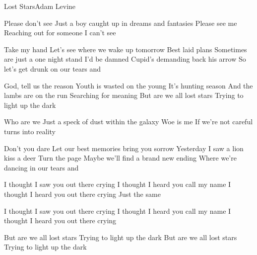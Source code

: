 \documentclass[a4paper,11pt,french]{article}
\begin{document}

\begin{Song}{Lost Stars}{Adam Levine}
\begin{multicols}{2}

\begin{Verse}
Please don't see
Just a boy caught up in dreams and fantasies
Please see me
Reaching out for someone I can't see
\espaceInterStrophe

Take my hand 
Let's see where we wake up tomorrow
Best laid plans 
Sometimes are just a one night stand
I'd be damned 
Cupid's demanding back his arrow
So let's get drunk on our tears and
\end{Verse}
\espaceInterStrophe

\begin{Chorus}
God, tell us the reason 
Youth is wasted on the young
It's hunting season 
And the lambs are on the run
Searching for meaning
But are we all lost stars
Trying to light up the dark
\end{Chorus}
\vfill
\columnbreak

\begin{Verse}
Who are we
Just a speck of dust within the galaxy
Woe is me
If we're not careful turns into reality
\espaceInterStrophe

Don't you dare
Let our best memories bring you sorrow
Yesterday
I saw a lion kiss a deer
Turn the page
Maybe we'll find a brand new ending
Where we're dancing in our tears and
\end{Verse}
\espaceInterStrophe

\tochorus
\espaceInterStrophe

\begin{Bridge}
I thought I saw you out there crying
I thought I heard you call my name
I thought I heard you out there crying
Just the same
\end{Bridge}
\espaceInterStrophe

\tochorus
\espaceInterStrophe

\begin{Bridge}
I thought I saw you out there crying
I thought I heard you call my name
I thought I heard you out there crying
\end{Bridge}
\espaceInterStrophe

\begin{Chorus}
But are we all lost stars
Trying to light up the dark
But are we all lost stars
Trying to light up the dark
\end{Chorus}


\end{multicols}
\end{Song}
\end{document}
